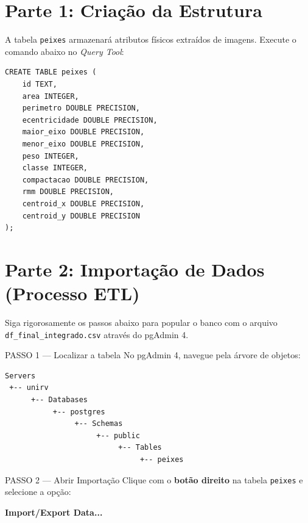 \documentclass[12pt]{article}
\begin{document}
\vspace{0.5cm}

\section*{Parte 1: Criação da Estrutura}
A tabela \texttt{peixes} armazenará atributos físicos extraídos de imagens. Execute o comando abaixo no \textit{Query Tool}:

\begin{lstlisting}[caption={Criação da tabela peixes}]
CREATE TABLE peixes (
    id TEXT,
    area INTEGER,
    perimetro DOUBLE PRECISION,
    ecentricidade DOUBLE PRECISION,
    maior_eixo DOUBLE PRECISION,
    menor_eixo DOUBLE PRECISION,
    peso INTEGER,
    classe INTEGER,
    compactacao DOUBLE PRECISION,
    rmm DOUBLE PRECISION,
    centroid_x DOUBLE PRECISION,
    centroid_y DOUBLE PRECISION
);
\end{lstlisting}

\vspace{0.5cm}

\section*{Parte 2: Importação de Dados (Processo ETL)}

Siga rigorosamente os passos abaixo para popular o banco com o arquivo \texttt{df\_final\_integrado.csv} através do pgAdmin 4.

\vspace{0.3cm}

\begin{block}{PASSO 1 --- Localizar a tabela}
No pgAdmin 4, navegue pela árvore de objetos:
\begin{verbatim}
Servers
 +-- unirv
      +-- Databases
           +-- postgres
                +-- Schemas
                     +-- public
                          +-- Tables
                               +-- peixes
\end{verbatim}
\end{block}

\begin{block}{PASSO 2 --- Abrir Importação}
Clique com o \textbf{botão direito} na tabela \texttt{peixes} e selecione a opção:
\begin{center}
    \textbf{Import/Export Data...}
\end{center}
\end{block}
\end{document}
